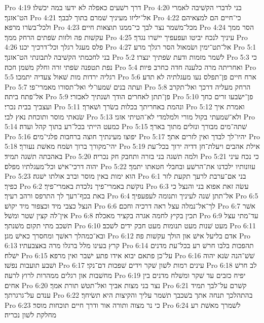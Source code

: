 Pro 4:19  דרך רשׁעים כאפלה לא ידעו במה יכשׁלו׃
Pro 4:20  בני לדברי הקשׁיבה לאמרי הט־אזנך׃
Pro 4:21  אל־יליזו מעיניך שׁמרם בתוך לבבך׃
Pro 4:22  כי־חיים הם למצאיהם ולכל־בשׂרו מרפא׃
Pro 4:23  מכל־משׁמר נצר לבך כי־ממנו תוצאות חיים׃
Pro 4:24  הסר ממך עקשׁות פה ולזות שׂפתים הרחק ממך׃
Pro 4:25  עיניך לנכח יביטו ועפעפיך יישׁרו נגדך׃
Pro 4:26  פלס מעגל רגלך וכל־דרכיך יכנו׃
Pro 4:27  אל־תט־ימין ושׂמאול הסר רגלך מרע׃
Pro 5:1  בני לחכמתי הקשׁיבה לתבונתי הט־אזנך׃
Pro 5:2  לשׁמר מזמות ודעת שׂפתיך ינצרו׃
Pro 5:3  כי נפת תטפנה שׂפתי זרה וחלק משׁמן חכה׃
Pro 5:4  ואחריתה מרה כלענה חדה כחרב פיות׃
Pro 5:5  רגליה ירדות מות שׁאול צעדיה יתמכו׃
Pro 5:6  ארח חיים פן־תפלס נעו מעגלתיה לא תדע׃
Pro 5:7  ועתה בנים שׁמעו־לי ואל־תסורו מאמרי־פי׃
Pro 5:8  הרחק מעליה דרכך ואל־תקרב אל־פתח ביתה׃
Pro 5:9  פן־תתן לאחרים הודך ושׁנתיך לאכזרי׃
Pro 5:10  פן־ישׂבעו זרים כחך ועצביך בבית נכרי׃
Pro 5:11  ונהמת באחריתך בכלות בשׂרך ושׁארך׃
Pro 5:12  ואמרת איך שׂנאתי מוסר ותוכחת נאץ לבי׃
Pro 5:13  ולא־שׁמעתי בקול מורי ולמלמדי לא־הטיתי אזני׃
Pro 5:14  כמעט הייתי בכל־רע בתוך קהל ועדה׃
Pro 5:15  שׁתה־מים מבורך ונזלים מתוך בארך׃
Pro 5:16  יפוצו מעינתיך חוצה ברחבות פלגי־מים׃
Pro 5:17  יהיו־לך לבדך ואין לזרים אתך׃
Pro 5:18  יהי־מקורך ברוך ושׂמח מאשׁת נעורך׃
Pro 5:19  אילת אהבים ויעלת־חן דדיה ירוך בכל־עת באהבתה תשׁגה תמיד׃
Pro 5:20  ולמה תשׁגה בני בזרה ותחבק חק נכריה׃
Pro 5:21  כי נכח עיני יהוה דרכי־אישׁ וכל־מעגלתיו מפלס׃
Pro 5:22  עוונותיו ילכדנו את־הרשׁע ובחבלי חטאתו יתמך׃
Pro 5:23  הוא ימות באין מוסר וברב אולתו ישׁגה׃
Pro 6:1  בני אם־ערבת לרעך תקעת לזר כפיך׃
Pro 6:2  נוקשׁת באמרי־פיך נלכדת באמרי־פיך׃
Pro 6:3  עשׂה זאת אפוא בני והנצל כי באת בכף־רעך לך התרפס ורהב רעיך׃
Pro 6:4  אל־תתן שׁנה לעיניך ותנומה לעפעפיך׃
Pro 6:5  הנצל כצבי מיד וכצפור מיד יקושׁ׃
Pro 6:6  לך־אל־נמלה עצל ראה דרכיה וחכם׃
Pro 6:7  אשׁר אין־לה קצין שׁטר ומשׁל׃
Pro 6:8  תכין בקיץ לחמה אגרה בקציר מאכלה׃
Pro 6:9  עד־מתי עצל תשׁכב מתי תקום משׁנתך׃
Pro 6:10  מעט שׁנות מעט תנומות מעט חבק ידים לשׁכב׃
Pro 6:11  ובא־כמהלך ראשׁך ומחסרך כאישׁ מגן׃
Pro 6:12  אדם בליעל אישׁ און הולך עקשׁות פה׃
Pro 6:13  קרץ בעינו מלל ברגלו מרה באצבעתיו׃
Pro 6:14  תהפכות בלבו חרשׁ רע בכל־עת מדנים ישׁלח׃
Pro 6:15  על־כן פתאם יבוא אידו פתע ישׁבר ואין מרפא׃
Pro 6:16  שׁשׁ־הנה שׂנא יהוה ושׁבע תועבות נפשׁו׃
Pro 6:17  עינים רמות לשׁון שׁקר וידים שׁפכות דם־נקי׃
Pro 6:18  לב חרשׁ מחשׁבות און רגלים ממהרות לרוץ לרעה׃
Pro 6:19  יפיח כזבים עד שׁקר ומשׁלח מדנים בין אחים׃
Pro 6:20  נצר בני מצות אביך ואל־תטשׁ תורת אמך׃
Pro 6:21  קשׁרם על־לבך תמיד ענדם על־גרגרתך׃
Pro 6:22  בהתהלכך תנחה אתך בשׁכבך תשׁמר עליך והקיצות היא תשׂיחך׃
Pro 6:23  כי נר מצוה ותורה אור ודרך חיים תוכחות מוסר׃
Pro 6:24  לשׁמרך מאשׁת רע מחלקת לשׁון נכריה׃
